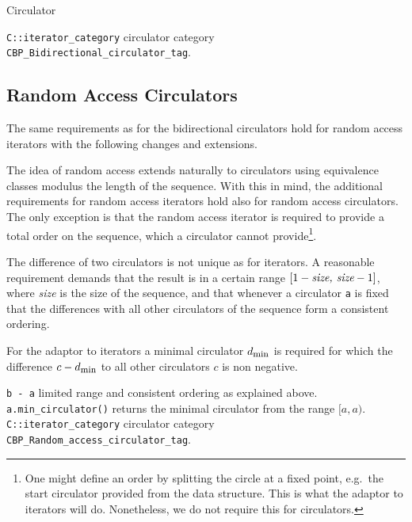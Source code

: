 \begin{ccRefConcept}{Circulator}
\begin{tabbing}
    {\tt C::iterator\_category} \>  circulator category {\tt 
                                CBP\_Bidirectional\_circulator\_tag}.
\end{tabbing}


\subsection*{Random Access Circulators}
\label{sectionMinCircleRequ}

The same requirements as for the bidirectional circulators hold for
random access iterators with the following changes and extensions. 

The idea of random access extends naturally to circulators using
equivalence classes modulus the length of the sequence. With this in
mind, the additional requirements for random access iterators hold
also for random access circulators. The only exception is that the
random access iterator is required to provide a total order on the
sequence, which a circulator cannot provide\footnote{One might define
  an order by splitting the circle at a fixed point, e.g.~the start
  circulator provided from the data structure. This is what the
  adaptor to iterators will do. Nonetheless, we do not require this
  for circulators.}.

The difference of two circulators is not unique as for iterators. A
reasonable requirement demands that the result is in a certain range
$[1-\mbox{{\it size, size}}-1]$, where {\it size} is the size of the
sequence, and that whenever a circulator {\tt a} is fixed that
the differences with all other circulators of the sequence form a
consistent ordering.

For the adaptor to iterators a minimal circulator
$d_{\mbox{\footnotesize min}}$ is required for which the difference $c
- d_{\mbox{\footnotesize min}}$ to all other circulators $c$ is non
negative.

\begin{tabbing}
    {\tt b - a}   \> limited range and consistent ordering 
                       as explained above.\\
    {\tt a.min\_circulator()}   \>  returns the minimal circulator from the 
                       range $[a,a)$.\\
    {\tt C::iterator\_category} \>  circulator category {\tt 
                                CBP\_Random\_access\_circulator\_tag}.
\end{tabbing}


\end{ccRefConcept}

